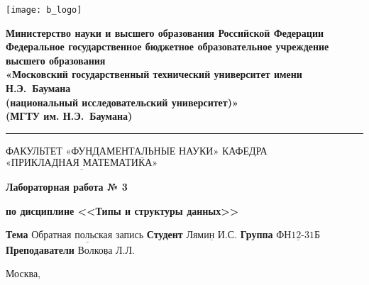 \thispagestyle{empty}

\noindent \begin{minipage}{0.15\textwidth}
	\texttt{[image: b\_logo]}
\end{minipage}
\noindent\begin{minipage}{0.85\textwidth}\centering
	\textbf{Министерство науки и высшего образования Российской Федерации}\\
	\textbf{Федеральное государственное бюджетное образовательное учреждение высшего образования}\\
	\textbf{«Московский государственный технический университет имени Н.Э.~Баумана}\\
	\textbf{(национальный исследовательский университет)»}\\
	\textbf{(МГТУ им. Н.Э.~Баумана)}
\end{minipage}

\noindent\rule{\linewidth}{3pt}
\newline\newline
\noindent ФАКУЛЬТЕТ $\underline{\text{«ФУНДАМЕНТАЛЬНЫЕ НАУКИ»}}$ \newline\newline
\noindent КАФЕДРА $\underline{\text{«ПРИКЛАДНАЯ МАТЕМАТИКА»}}$

\vspace{1cm}

\begin{center}
	\noindent\centering
		\Large\textbf{Лабораторная работа № 3}
	
\end{center}
\begin{center}
	\noindent\centering
		\Large\textbf{по дисциплине <<Типы и структуры данных>>}
\end{center}

\noindent\textbf{Тема} $\underline{\text{Обратная польская запись}}$\newline\newline
\noindent\textbf{Студент} $\underline{\text{Лямин И.С.}}$\newline\newline
\noindent\textbf{Группа} $\underline{\text{ФН12-31Б}}$\newline\newline
\noindent\textbf{Преподаватели} $\underline{\text{Волкова Л.Л.}}$\newline

\begin{center}
	\vfill
	Москва,~\the\year 
\end{center}
\clearpage

